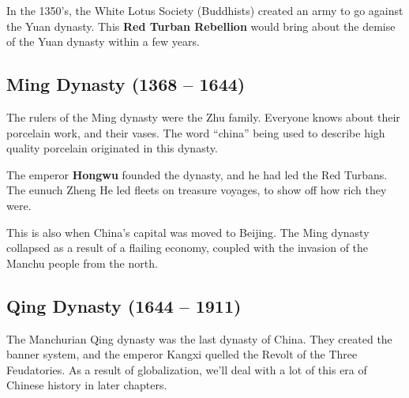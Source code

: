 In the 1350's, the White Lotus Society (Buddhists) created an army to go against the Yuan dynasty.
This \textbf{Red Turban Rebellion} would bring about the demise of the Yuan dynasty within a few years.

\subsection*{Ming Dynasty (1368 -- 1644)}

The rulers of the Ming dynasty were the Zhu family.
Everyone knows about their porcelain work, and their vases.
The word ``china'' being used to describe high quality porcelain originated in this dynasty.

The emperor \textbf{Hongwu} founded the dynasty, and he had led the Red Turbans.
The eunuch Zheng He led fleets on treasure voyages, to show off how rich they were.

This is also when China's capital was moved to Beijing.
The Ming dynasty collapsed as a result of a flailing economy,
coupled with the invasion of the Manchu people from the north.

\subsection*{Qing Dynasty (1644 -- 1911)}

The Manchurian Qing dynasty was the last dynasty of China.
They created the banner system, and the emperor Kangxi quelled the Revolt of the Three Feudatories.
As a result of globalization, we'll deal with a lot of this era of Chinese history in later chapters.

